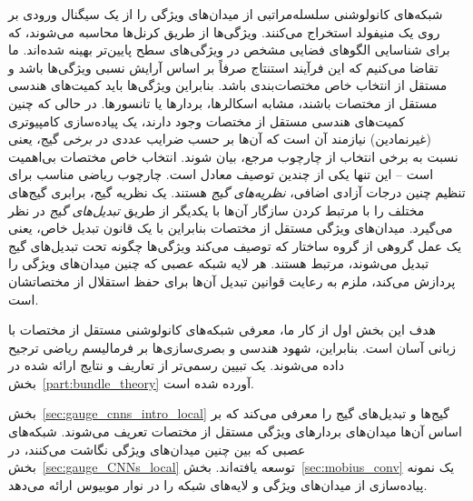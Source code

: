 

\label{part:local_theory}


شبکه‌های کانولوشنی سلسله‌مراتبی از میدان‌های ویژگی را از یک سیگنال ورودی بر روی یک منیفولد استخراج می‌کنند.
ویژگی‌ها از طریق کرنل‌ها محاسبه می‌شوند، که برای شناسایی الگوهای فضایی مشخص در ویژگی‌های سطح پایین‌تر بهینه شده‌اند.
ما تقاضا می‌کنیم که این فرآیند استنتاج صرفاً بر اساس آرایش نسبی ویژگی‌ها باشد و مستقل از انتخاب خاص مختصات‌بندی باشد.
بنابراین ویژگی‌ها باید کمیت‌های هندسی مستقل از مختصات باشند، مشابه اسکالرها، بردارها یا تانسورها.
در حالی که چنین کمیت‌های هندسی مستقل از مختصات وجود دارند، یک پیاده‌سازی کامپیوتری (غیرنمادین) نیازمند آن است که آن‌ها بر حسب ضرایب عددی در \emph{برخی} گیج، یعنی نسبت به برخی انتخاب از چارچوب مرجع، بیان شوند.
انتخاب خاص مختصات بی‌اهمیت است -- این تنها یکی از چندین توصیف معادل است.
چارچوب ریاضی مناسب برای تنظیم چنین درجات آزادی اضافی، \emph{نظریه‌های گیج} هستند.
یک نظریه گیج، برابری گیج‌های مختلف را با مرتبط کردن سازگار آن‌ها با یکدیگر از طریق \emph{تبدیل‌های گیج} در نظر می‌گیرد.
میدان‌های ویژگی مستقل از مختصات بنابراین با یک قانون تبدیل خاص، یعنی یک عمل گروهی از گروه ساختار که توصیف می‌کند ویژگی‌ها چگونه تحت تبدیل‌های گیج تبدیل می‌شوند، مرتبط هستند.
هر لایه شبکه عصبی که چنین میدان‌های ویژگی را پردازش می‌کند، ملزم به رعایت قوانین تبدیل آن‌ها برای حفظ استقلال از مختصاتشان است.


هدف این بخش اول از کار ما، معرفی شبکه‌های کانولوشنی مستقل از مختصات با زبانی آسان است.
بنابراین، شهود هندسی و بصری‌سازی‌ها بر فرمالیسم ریاضی ترجیح داده می‌شوند.
یک تبیین رسمی‌تر از تعاریف و نتایج ارائه شده در بخش~\ref{part:bundle_theory} آورده شده است.


\etocsettocstyle{}{} %
\localtableofcontents

\vspace*{2.ex}

بخش~\ref{sec:gauge_cnns_intro_local} گیج‌ها و تبدیل‌های گیج را معرفی می‌کند که بر اساس آن‌ها میدان‌های بردارهای ویژگی مستقل از مختصات تعریف می‌شوند.
شبکه‌های عصبی که بین چنین میدان‌های ویژگی نگاشت می‌کنند، در بخش~\ref{sec:gauge_CNNs_local} توسعه یافته‌اند.
بخش~\ref{sec:mobius_conv} یک نمونه پیاده‌سازی از میدان‌های ویژگی و لایه‌های شبکه را در نوار موبیوس ارائه می‌دهد.